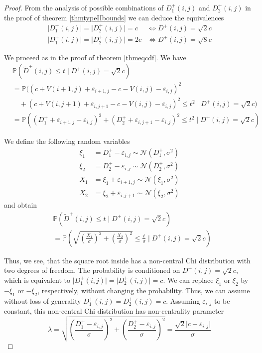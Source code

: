 \documentclass[a4paper,12pt]{article}
\newcommand{\abs}[1]{\lvert#1\rvert}
\theoremstyle{plain}
\theoremstyle{definition}
\theoremstyle{remark}
\begin{document}
\begin{proof}
	From the analysis of possible combinations of $D_1^+(i, j)$ and $D_2^+(i, j)$ in the proof of theorem \ref{thmtypeIIbounds} we can deduce the equivalences
	\begin{align*}
		\abs{D_1^+(i, j)} = \abs{D_2^+(i, j)} = c &\Leftrightarrow D^+(i, j) = \sqrt{2} c \\
		\abs{D_1^+(i, j)} = \abs{D_2^+(i, j)} = 2 c &\Leftrightarrow D^+(i, j) = \sqrt{8} c
	\end{align*}
	
	We proceed as in the proof of theorem \ref{thmeqcdf}. We have
	\begin{align*}
		&\mathbb{P}(\tilde{D}^+(i, j) \leq t \mid D^+(i, j) = \sqrt{2} c) \\
		&= \mathbb{P}\big( (c + V(i + 1, j) + \varepsilon_{i + 1, j} - c - V(i, j) - \varepsilon_{i, j})^2 \\
		&\quad + (c + V(i, j + 1) + \varepsilon_{i, j + 1} - c - V(i, j) - \varepsilon_{i, j})^2 \leq t^2 \mid D^+(i, j) = \sqrt{2} c \big) \\
		&= \mathbb{P}\left( (D_1^+ + \varepsilon_{i + 1, j} - \varepsilon_{i, j})^2 + (D_2^+ + \varepsilon_{i, j + 1} - \varepsilon_{i, j})^2 \leq t^2 \mid D^+(i, j) = \sqrt{2} c \right)
	\end{align*}
	
	We define the following random variables
	\begin{align*}
		\xi_1 &= D_1^+ - \varepsilon_{i, j} \sim \mathcal{N}(D_1^+, \sigma^2) \\
		\xi_2 &= D_2^+ - \varepsilon_{i, j} \sim \mathcal{N}(D_2^+, \sigma^2) \\
		X_1 &= \xi_1 + \varepsilon_{i + 1, j} \sim \mathcal{N}(\xi_1, \sigma^2) \\
		X_2 &= \xi_2 + \varepsilon_{i, j + 1} \sim \mathcal{N}(\xi_2, \sigma^2)
	\end{align*}
	and obtain
	\begin{align*}
		&\mathbb{P}(\tilde{D}^+(i, j) \leq t \mid D^+(i, j) = \sqrt{2} c) \\
		&= \mathbb{P}\left( \sqrt{\left( \frac{X_1}{\sigma} \right)^2 + \left( \frac{X_2}{\sigma} \right)^2} \leq \frac{t}{\sigma} \mid D^+(i, j) = \sqrt{2} c \right)
	\end{align*}
	
	Thus, we see, that the square root inside has a non-central Chi distribution with two degrees of freedom. The probability is conditioned on $D^+(i, j) = \sqrt{2} c$, which is equivalent to $\abs{D_1^+(i, j)} = \abs{D_2^+(i, j)} = c$. We can replace $\xi_1$ or $\xi_2$ by $- \xi_1$ or $- \xi_2$, respectively, without changing the probability. Thus, we can assume without loss of generality $D_1^+(i, j) = D_2^+(i, j) = c$. Assuming $\varepsilon_{i, j}$ to be constant, this non-central Chi distribution has non-centrality parameter
	\begin{equation*}
		\lambda = \sqrt{\left( \frac{D_1^+ - \varepsilon_{i, j}}{\sigma} \right)^2 + \left( \frac{D_2^+ - \varepsilon_{i, j}}{\sigma} \right)^2} = \frac{\sqrt{2} \abs{c - \varepsilon_{i, j}}}{\sigma}
	\end{equation*}
	

\end{proof}
\end{document}
